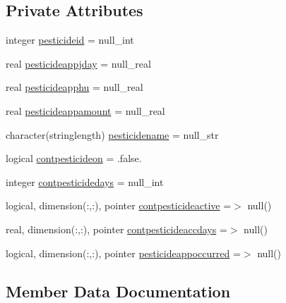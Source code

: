 \subsection*{Private Attributes}
\begin{DoxyCompactItemize}
\item 
integer \mbox{\hyperlink{structmodulevegetation_1_1t__pesticideapps_add15f60169163bec98ff689bd09c63d5}{pesticideid}} = null\+\_\+int
\item 
real \mbox{\hyperlink{structmodulevegetation_1_1t__pesticideapps_a689586ab877df3a205071aefa92e5f49}{pesticideappjday}} = null\+\_\+real
\item 
real \mbox{\hyperlink{structmodulevegetation_1_1t__pesticideapps_a658a611a43b3ce77372a3105dec7ee0c}{pesticideapphu}} = null\+\_\+real
\item 
real \mbox{\hyperlink{structmodulevegetation_1_1t__pesticideapps_ab07d924989e7cf20cd24da5960b101b3}{pesticideappamount}} = null\+\_\+real
\item 
character(stringlength) \mbox{\hyperlink{structmodulevegetation_1_1t__pesticideapps_aaa4dbedfee107c1fd2f9cbd73019b9e8}{pesticidename}} = null\+\_\+str
\item 
logical \mbox{\hyperlink{structmodulevegetation_1_1t__pesticideapps_a0b2a17e48f698b9a4f73c2383953356b}{contpesticideon}} = .false.
\item 
integer \mbox{\hyperlink{structmodulevegetation_1_1t__pesticideapps_ae9df8fc0d0db9f6968ff533fb8e27e0e}{contpesticidedays}} = null\+\_\+int
\item 
logical, dimension(\+:,\+:), pointer \mbox{\hyperlink{structmodulevegetation_1_1t__pesticideapps_a4a4c70fca268ec2151aad069a2990124}{contpesticideactive}} =$>$ null()
\item 
real, dimension(\+:,\+:), pointer \mbox{\hyperlink{structmodulevegetation_1_1t__pesticideapps_ac9b2b226659044018184ebf9aa3b98d6}{contpesticideaccdays}} =$>$ null()
\item 
logical, dimension(\+:,\+:), pointer \mbox{\hyperlink{structmodulevegetation_1_1t__pesticideapps_aa10a7503acdbfc56ddbf005c7ddcc62b}{pesticideappoccurred}} =$>$ null()
\end{DoxyCompactItemize}


\subsection{Member Data Documentation}
\mbox{\label{structmodulevegetation_1_1t__pesticideapps_ac9b2b226659044018184ebf9aa3b98d6}} 
